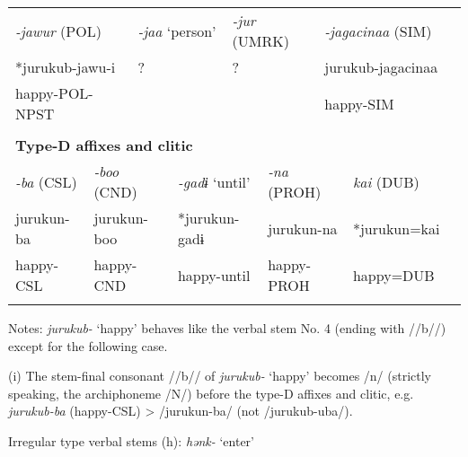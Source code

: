 \begin{tabularx}{\textwidth}{XXXXXXXXXm{}XXXXXXXXX}
\multicolumn{4}{X}{{ \textit{{}-jawur} (POL)}} & \multicolumn{2}{X}{{ \textit{{}-jaa} ‘person’}} & \multicolumn{4}{X}{{ \textit{{}-jur} (UMRK)}} & \multicolumn{9}{X}{{ \textit{{}-jagacinaa} (SIM)}}\\
\multicolumn{4}{X}{{ *jurukub-jawu-i}} & \multicolumn{2}{X}{{ ?}} & \multicolumn{4}{X}{?} & \multicolumn{9}{X}{{ jurukub-jagacinaa}}\\
\multicolumn{4}{X}{happy-POL-NPST} & \multicolumn{2}{X}{} & \multicolumn{4}{X}{} & \multicolumn{9}{X}{happy-SIM}\\
\multicolumn{19}{X}{}\\
\multicolumn{19}{X}{{\bfseries Type-D affixes and clitic}}\\
{ \textit{{}-ba} (CSL)} & \multicolumn{4}{X}{{ \textit{{}-boo} (CND)}} & \multicolumn{3}{X}{{ \textit{{}-gadɨ} ‘until’}} & \multicolumn{3}{X}{{ \textit{{}-na} (PROH)}} & \multicolumn{8}{X}{{ \textit{kai} (DUB)}}\\
{ jurukun-ba} & \multicolumn{4}{X}{{ jurukun-boo}} & \multicolumn{3}{X}{{ *jurukun-gadɨ}} & \multicolumn{3}{X}{{ jurukun-na}} & \multicolumn{8}{X}{{ *jurukun=kai}}\\
happy-CSL & \multicolumn{4}{X}{happy-CND} & \multicolumn{3}{X}{happy-until} & \multicolumn{3}{X}{happy-PROH} & \multicolumn{8}{X}{happy=DUB}\\
\lspbottomrule
\end{tabularx}
Notes: \textit{jurukub-} ‘happy’ behaves like the verbal stem No. 4 (ending with //b//) except for the following case.

(i)  The stem-final consonant //b// of \textit{jurukub-} ‘happy’ becomes /n/ (strictly speaking, the archiphoneme /N/) before the type-D affixes and clitic, e.g. \textit{jurukub-ba} (happy-CSL) > /jurukun-ba/ (not /jurukub-uba/).

Irregular type verbal stems (h): \textit{hənk-} ‘enter’

\tablefirsthead{}

